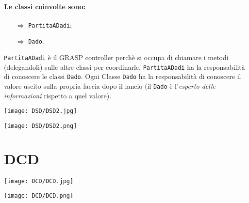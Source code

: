 \paragraph{Le classi coinvolte sono:}

\begin{itemize}
  \item [$\Rightarrow$] \texttt{PartitaADadi};
  \item [$\Rightarrow$] \texttt{Dado}.
\end{itemize}

\texttt{PartitaADadi} è il GRASP controller perchè si occupa di chiamare i metodi (delegandoli) sulle altre classi per coordinarle. \texttt{PartitaADadi} ha la responsabilità di conoscere le classi \texttt{Dado}. Ogni Classe \texttt{Dado} ha la responsabilità di conoscere il valore uscito sulla propria faccia dopo il lancio (il \texttt{Dado} è l'\textit{esperto delle informazioni} rispetto a quel valore).

\begin{center}
  \texttt{[image: DSD/DSD2.jpg]}
\end{center}


\begin{center}
  \texttt{[image: DSD/DSD2.png]}
\end{center}

\section{DCD}


\begin{center}
  \texttt{[image: DCD/DCD.jpg]}
\end{center}


\begin{center}
  \texttt{[image: DCD/DCD.png]}
\end{center}
